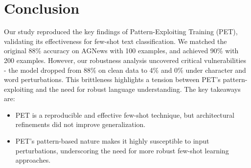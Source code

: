 \documentclass[11pt,a4paper]{article}
\begin{document}
\section{Conclusion}
Our study reproduced the key findings of Pattern-Exploiting Training (PET), validating its effectiveness for few-shot text classification. We matched the original 88\% accuracy on AGNews with 100 examples, and achieved 90\% with 200 examples. However, our robustness analysis uncovered critical vulnerabilities - the model dropped from 88\% on clean data to 4\% and 0\% under character and word perturbations. This brittleness highlights a tension between PET's pattern-exploiting and the need for robust language understanding.
The key takeaways are:
\begin{itemize}[topsep=0pt]
  \item PET is a reproducible and effective few-shot technique, but architectural refinements did not improve generalization.
  \item PET's pattern-based nature makes it highly susceptible to input perturbations, underscoring the need for more robust few-shot learning approaches.
\end{itemize}



\end{document}
